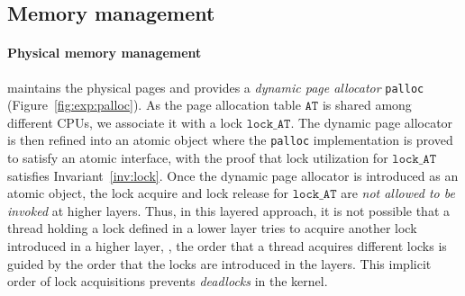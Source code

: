 {\subsection{Memory management}
\label{sec:con:mem}


\vspace{-3pt}
\paragraph{Physical memory management}
\label{sec:base:memm}
maintains the physical pages and provides a \emph{dynamic page allocator}
\texttt{palloc} (\cf Figure~\ref{fig:exp:palloc}).
As the page allocation table $\texttt{AT}$ is shared among different CPUs, 
we associate it with a lock $\texttt{lock\_AT}$.
The dynamic page allocator is then refined into an atomic object where
the \texttt{palloc} implementation is proved to satisfy an atomic interface,
with the proof that
lock utilization for $\texttt{lock\_AT}$ satisfies Invariant~\ref{inv:lock}.
Once the dynamic page allocator is introduced as
 an atomic object, the lock acquire and lock release 
for $\texttt{lock\_AT}$
are \emph{not allowed to be invoked} at higher layers. 
Thus, in this layered approach, it is not possible
that a thread holding a lock defined in a lower layer tries to acquire another lock
introduced in a higher layer, \ie, the order that a thread acquires different
locks is guided by the order that the locks are introduced in the layers.
This implicit order of lock acquisitions prevents \emph{deadlocks} in the
{\mCTOS} kernel.

}
